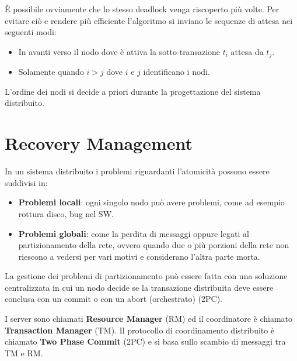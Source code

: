 È possibile ovviamente che lo stesso deadlock venga riscoperto più volte. Per
evitare ciò e rendere più efficiente l'algoritmo si inviano le sequenze di attesa
nei seguenti modi:
\begin{itemize}
      \item In avanti verso il nodo dove è attiva la sotto-transazione $t_i$
            attesa da $t_j$.
      \item Solamente quando $i > j$ dove $i$ e $j$ identificano i nodi.
\end{itemize}

L'ordine dei nodi si decide a priori durante la progettazione del sistema distribuito.

\section{Recovery Management}
In un sistema distribuito i problemi riguardanti l'atomicità possono essere
suddivisi in:
\begin{itemize}
      \item \textbf{Problemi locali}: ogni singolo nodo può avere problemi, come ad
            esempio rottura disco, bug nel SW.
      \item \textbf{Problemi globali}: come la perdita di messaggi oppure legati al
            partizionamento della rete, ovvero quando due o più porzioni della
            rete non riescono a vedersi per vari motivi e considerano l'altra
            parte morta.
\end{itemize}
La gestione dei problemi di partizionamento può essere fatta con una soluzione
centralizzata in cui un nodo decide se la transazione distribuita deve essere
conclusa con un commit o con un abort (orchestrato) (2PC).

I server sono chiamati \textbf{Resource Manager} (RM) ed il coordinatore è
chiamato \textbf{Transaction Manager} (TM). Il protocollo di coordinamento
distribuito è chiamato \textbf{Two Phase Commit} (2PC) e si basa sullo scambio
di messaggi tra TM e RM.


